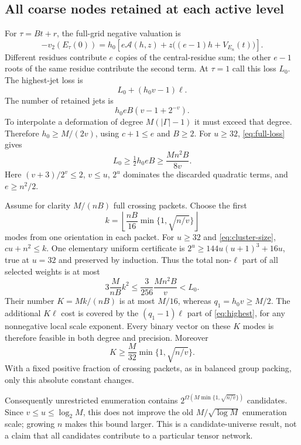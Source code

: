 \documentclass[11pt]{article}
\begin{document}
\subsection{All coarse nodes retained at each active level}
For $\tau=Bt+r$, the full-grid negative valuation is
\begin{equation}
 -v_2(E_\tau(0))
 =h_0\left[e\mathcal A(h,z)
       +z\bigl((e-1)h+V_{E_n}(t)\bigr)\right].
 \label{eq:full-loss}
\end{equation}
Different residues contribute $e$ copies of the central-residue sum;
the other $e-1$ roots of the same residue contribute the second term.
At $\tau=1$ call this loss $L_0$. The highest-jet loss is
\[
 L_0+(h_0v-1)\ell.
\]
The number of retained jets is
\[
 h_0 eB(v-1+2^{-v}).
\]
To interpolate a deformation of degree $M(|\Gamma|-1)$ it must exceed
that degree. Therefore $h_0\ge M/(2v)$, using $c+1\le e$ and $B\ge2$.
For $u\ge32$, \eqref{eq:full-loss} gives
\begin{equation}
 L_0\ge\tfrac12 h_0eB\ge\frac{Mn^2B}{8v}.
 \label{eq:precision-lower}
\end{equation}
Here $(v+3)/2^v\le2$, $v\le u$, $2^u$ dominates the discarded
quadratic terms, and $e\ge n^2/2$.

Assume for clarity $M/(nB)$ full crossing packets. Choose the first
\[
 k=\left\lfloor\frac{nB}{16}
                 \min\{1,\sqrt{n/v}\}\right\rfloor
\]
modes from one orientation in each packet. For $u\ge32$ and
\eqref{eq:cluster-size}, $cu+n^2\le k$.
One elementary uniform certificate is
$2^u\ge144u(u+1)^3+16u$, true at $u=32$ and preserved by induction.
Thus the total non-$\ell$ part of all selected weights is at most
\[
 3\frac{M}{nB}k^2
 \le\frac{3}{256}\frac{Mn^2B}{v}<L_0.
\]
Their number $K=Mk/(nB)$ is at most $M/16$, whereas
$q_1=h_0v\ge M/2$. The additional $K\ell$ cost is covered by the
$(q_1-1)\ell$ part of \eqref{eq:highest}, for any nonnegative local
scale exponent. Every binary vector on these $K$ modes is therefore
feasible in both degree and precision. Moreover
\begin{equation}
 K\ge\frac M{32}\min\{1,\sqrt{n/v}\}.
 \label{eq:candidates}
\end{equation}
With a fixed positive fraction of crossing packets, as in balanced
group packing, only this absolute constant changes.

Consequently unrestricted enumeration contains
$2^{\Omega(M\min\{1,\sqrt{n/v}\})}$ candidates. Since
$v\le u\le\log_2 M$, this does not improve the old
$M/\sqrt{\log M}$ enumeration scale; growing $n$ makes this bound
larger. This is a candidate-universe result, not a claim that all
candidates contribute to a particular tensor network.
\end{document}
